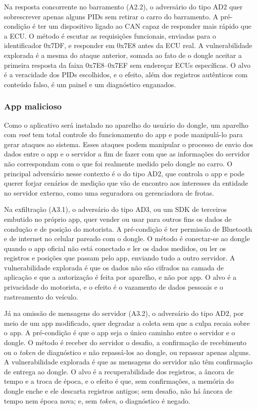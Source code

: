 \documentclass[
	12pt,
	article,			%
	oneside,
	a4paper,
	english,
	brazil				%
	]{abntex2}
\begin{document}
Na resposta concorrente no barramento (A2.2), o adversário do tipo AD2 quer sobrescrever apenas alguns PIDs sem retirar o carro do barramento.
A pré-condição é ter um dispositivo ligado ao CAN capaz de responder mais rápido que a ECU. O método é escutar as requisições funcionais,
enviadas para o identificador 0x7DF, e responder em 0x7E8 antes da ECU real. A vulnerabilidade explorada é a mesma do ataque anterior,
somada ao fato de o dongle aceitar a primeira resposta da faixa 0x7E8--0x7EF sem endereçar ECUs específicas. O alvo é a veracidade dos PIDs
escolhidos, e o efeito, além dos registros autênticos com conteúdo falso, é um painel e um diagnóstico enganados.

\subsubsection{App malicioso} \label{secsec:app-malicioso}

Como o aplicativo será instalado no aparelho do usuário do dongle, um aparelho com \textit{root} tem total controle do
funcionamento do app e pode manipulá-lo para gerar ataques ao sistema. Esses ataques podem manipular o processo de envio dos
dados entre o app e o servidor a fim de fazer com que as informações do servidor não correspondam com o que foi realmente medido 
pelo dongle no carro. O principal adversário nesse contexto é o do tipo AD2, que controla o app e pode querer forjar cenários de
medição que vão de encontro aos interesses da entidade no servidor externo, como uma seguradora ou gerenciadora de frotas.

Na exfiltração (A3.1), o adversário do tipo AD3, ou um SDK de terceiros embutido no próprio app, quer vender ou usar para outros fins os dados de
condução e de posição do motorista. A pré-condição é ter permissão de Bluetooth e de internet no celular pareado com o dongle. O método é
conectar-se ao dongle quando o app oficial não está conectado e ler os dados medidos, ou ler os registros e posições que passam pelo app,
enviando tudo a outro servidor. A vulnerabilidade explorada é que os dados não são cifrados na camada de aplicação e que a autorização é
feita por aparelho, e não por app. O alvo é a privacidade do motorista, e o efeito é o vazamento de dados pessoais e o rastreamento do veículo.

Já na omissão de mensagens do servidor (A3.2), o adversário do tipo AD2, por meio de um app modificado, quer degradar a coleta sem que a culpa
recaia sobre o app. A pré-condição é que o app seja o único caminho entre o servidor e o dongle. O método é receber do servidor o desafio, a
confirmação de recebimento ou o \textit{token} de diagnóstico e não repassá-los ao dongle, ou repassar apenas alguns. A vulnerabilidade
explorada é que as mensagens do servidor não têm confirmação de entrega ao dongle. O alvo é a recuperabilidade dos registros, a âncora de
tempo e a troca de época, e o efeito é que, sem confirmações, a memória do dongle enche e ele descarta registros antigos; sem desafio, não
há âncora de tempo nem época nova; e, sem \textit{token}, o diagnóstico é negado.
\end{document}
